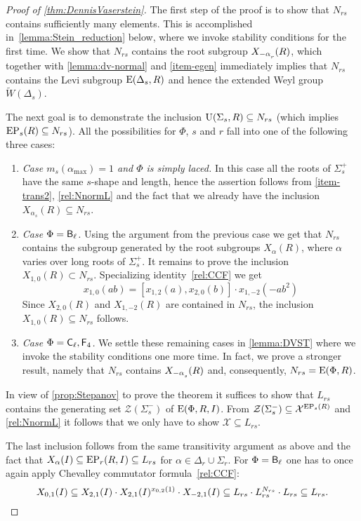 \begin{proof}[Proof of \cref{thm:DennisVaserstein}]
The first step of the proof is to show that $N_{rs}$ contains sufficiently many elements. 
This is accomplished in~\cref{lemma:Stein_reduction} below, where we invoke stability conditions for the first time.
We show that $N_{rs}$ contains the root subgroup $X_{-\alpha\ssub{r}}(R)$, which together with \cref{lemma:dv-normal} and \cref{item-egen} immediately implies that $N_{rs}$ contains the Levi subgroup $\operatorname{E}(\Delta_s, R)$ and hence the extended Weyl group $\widetilde{W}(\Delta_s)$.

The next goal is to demonstrate the inclusion $\operatorname{U}(\Sigma_s, R) \subseteq N_{rs}$ (which implies $\operatorname{EP}_s(R) \subseteq N_{rs}$).
All the possibilities for $\Phi$, $s$ and $r$ fall into one of the following three cases:
\begin{enumerate}
 \item \textit{Case $m_s(\alpha_{\mathrm{max}})=1$ and $\Phi$ is simply laced.}
  In this case all the roots of $\Sigma^+_s$ have the same $s$-shape and length, hence the assertion follows from \cref{item-trans2}, \eqref{rel:NnormL} and the fact that we already have the inclusion $X_{\alpha_s}(R) \subseteq N_{rs}$.
 \item \textit{Case $\Phi = \mathsf{B}_\ell$.} Using the argument from the previous case we get that $N_{rs}$ contains the subgroup generated by the root subgroups $X_\alpha(R)$, where $\alpha$ varies over long roots of $\Sigma_s^+$. 
  It remains to prove the inclusion $X_{1,0}(R) \subset N_{rs}$.
  Specializing identity~\eqref{rel:CCF} we get \begin{equation*} \label{rel:CCF-specBC} x_{1,0}(ab) = [x_{1, 2}(a), x_{2, 0}(b)] \cdot x_{1,-2}(-a b^2) \end{equation*}
  Since $X_{2, 0}(R)$ and $X_{1,-2}(R)$ are contained in $N_{rs}$, the inclusion $X_{1,0}(R) \subseteq N_{rs}$ follows.
 \item \textit{Case $\Phi = \mathsf{C}_\ell, \mathsf{F}_4$.}
 We settle these remaining cases in \cref{lemma:DVST} where we invoke the stability conditions one more time. 
 In fact, we prove a stronger result, namely that $N_{rs}$ contains $X_{-\alpha\ssub{s}}(R)$ and, consequently, $N_{rs} = \operatorname{E}(\Phi, R)$.
\end{enumerate}

In view of \cref{prop:Stepanov} to prove the theorem it suffices to show that $L_{rs}$ contains the generating set $\mathcal{Z}(\Sigma_s^-)$ of $\operatorname{E}(\Phi, R, I)$.
From $\mathcal{Z}(\Sigma_s^-) \subseteq \mathcal{X}^{\operatorname{EP}_s(R)}$ and \eqref{rel:NnormL} it follows that we only have to show $\mathcal{X} \subseteq L_{rs}$.

The last inclusion follows from the same transitivity argument as above and the fact that $X_\alpha(I) \subseteq \operatorname{EP}_r(R, I) \subseteq L_{rs}$ for $\alpha \in \Delta_r \cup \Sigma_r$.
For $\Phi=\mathsf{B}_\ell$ one has to once again apply Chevalley commutator formula~\eqref{rel:CCF}:
$$X_{0,1}(I) \subseteq X_{2,1}(I) \cdot X_{2,1}(I)^{x_{0,2}(1)} \cdot X_{-2,1}(I) \subseteq L_{rs} \cdot L_{rs}^{N_{rs}} \cdot L_{rs} \subseteq L_{rs}. \qedhere$$ 
\end{proof}

